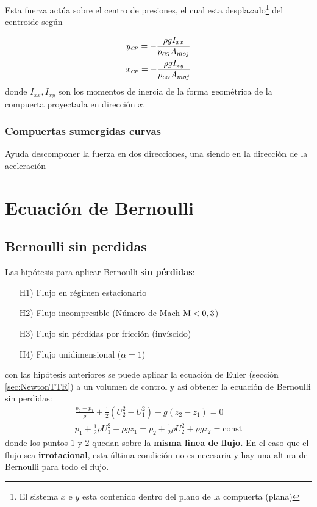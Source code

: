Esta fuerza actúa sobre el centro de presiones, el cual esta desplazado\footnote{El sistema $x$ e $y$ esta contenido dentro del plano de la compuerta (plana)} del centroide según

\begin{gather}
y_{{\mbox{\tiny $C\!P$}}} = -\frac{\rho g I_{xx}}{p_{{\mbox{\tiny $C\!G$}}}A_{moj}} \\
x_{{\mbox{\tiny $C\!P$}}} = - \frac{\rho g I_{xy}}{p_{{\mbox{\tiny $C\!G$}}}A_{moj}}
\end{gather}
donde $I_{xx},I_{xy}$ son los momentos de inercia de la forma geométrica de la compuerta proyectada en dirección $x$.

\subsubsection*{Compuertas sumergidas curvas}
Ayuda descomponer la fuerza en dos direcciones, una siendo en la dirección de la aceleración

\section{Ecuación de Bernoulli}
\subsection{Bernoulli sin perdidas}
Las hipótesis para aplicar Bernoulli \textbf{sin pérdidas}:
\begin{itemize}
    \item[H1)] Flujo en régimen estacionario
    \item[H2)] Flujo incompresible (Número de Mach $\textrm{M}<0,3$)
    \item[H3)] Flujo sin pérdidas por fricción (invíscido)
    \item[H4)] Flujo unidimensional ($\alpha=1$)
\end{itemize}
con las hipótesis anteriores se puede aplicar la ecuación de Euler (sección \ref{sec:NewtonTTR}) a un volumen de control y así obtener la ecuación de Bernoulli sin perdidas:
\begin{gather*}
    \frac{p_2-p_1}{\rho}+\tfrac{1}{2}(U_2^2-U_1^2)+g(z_2-z_1)=0\\
    p_1+\tfrac{1}{2}\rho U_1^2+\rho gz_1=p_2+\tfrac{1}{2}\rho U_2^2+\rho g z_2=\textrm{const}
\end{gather*}
donde los puntos $1$ y $2$ quedan sobre la \textbf{misma linea de flujo.} En el caso que el flujo sea \textbf{irrotacional}, esta última condición no es necesaria y hay una altura de Bernoulli para todo el flujo.

